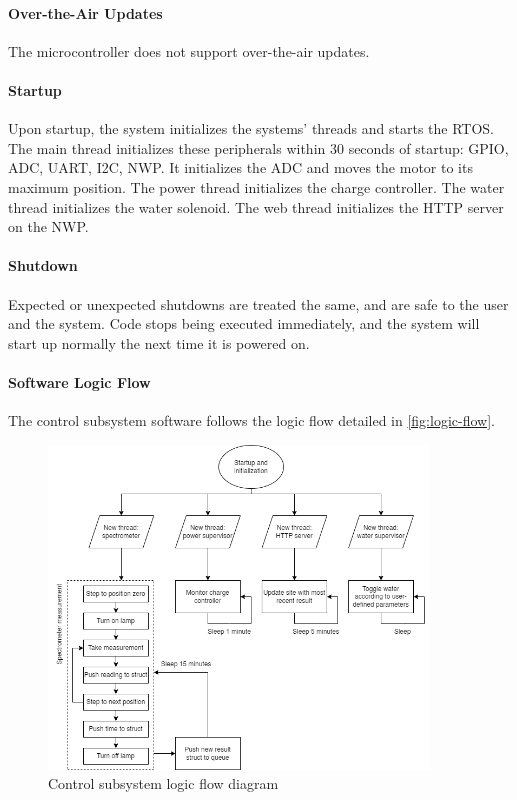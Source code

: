 \paragraph{Over-the-Air Updates}
The microcontroller does not support over-the-air updates.

\paragraph{Startup} Upon startup, the system initializes the systems' threads and starts the RTOS. The main thread initializes these peripherals within 30 seconds of startup: GPIO, ADC, UART, I2C, NWP. It initializes the ADC and moves the motor to its maximum position. The power thread initializes the charge controller. The water thread initializes the water solenoid. The web thread initializes the HTTP server on the NWP.

\paragraph{Shutdown} Expected or unexpected shutdowns are treated the same, and are safe to the user and the system. Code stops being executed immediately, and the system will start up normally the next time it is powered on.

\paragraph{Software Logic Flow} The control subsystem software follows the logic flow detailed in \autoref{fig:logic-flow}.

\begin{figure}[H]
    \caption{Control subsystem logic flow diagram}
    \label{fig:logic-flow}
    \centering
    \includegraphics[width=0.9\textwidth]{images/logic-flow.png}
\end{figure}

